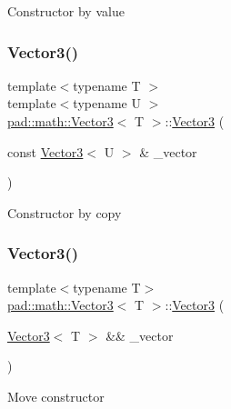 Constructor by value \mbox{\label{structpad_1_1math_1_1_vector3_a7f6a17638301c9ddaec4ea300a3c846a}} 
\subsubsection{\texorpdfstring{Vector3()}{Vector3()}\hspace{0.1cm}{\footnotesize\ttfamily [3/4]}}
{\footnotesize\ttfamily template$<$typename T $>$ \\
template$<$typename U $>$ \\
\mbox{\hyperlink{structpad_1_1math_1_1_vector3}{pad\+::math\+::\+Vector3}}$<$ T $>$\+::\mbox{\hyperlink{structpad_1_1math_1_1_vector3}{Vector3}} (\begin{DoxyParamCaption}\item[{const \mbox{\hyperlink{structpad_1_1math_1_1_vector3}{Vector3}}$<$ U $>$ \&}]{\+\_\+vector }\end{DoxyParamCaption})}

Constructor by copy \mbox{\label{structpad_1_1math_1_1_vector3_adf7a624bdd20e8d79c6fe663c36ce43b}} 
\subsubsection{\texorpdfstring{Vector3()}{Vector3()}\hspace{0.1cm}{\footnotesize\ttfamily [4/4]}}
{\footnotesize\ttfamily template$<$typename T$>$ \\
\mbox{\hyperlink{structpad_1_1math_1_1_vector3}{pad\+::math\+::\+Vector3}}$<$ T $>$\+::\mbox{\hyperlink{structpad_1_1math_1_1_vector3}{Vector3}} (\begin{DoxyParamCaption}\item[{\mbox{\hyperlink{structpad_1_1math_1_1_vector3}{Vector3}}$<$ T $>$ \&\&}]{\+\_\+vector }\end{DoxyParamCaption})\hspace{0.3cm}{\ttfamily [default]}}

Move constructor \mbox{\label{structpad_1_1math_1_1_vector3_a8a778f1112409992f9e95a10f9760cfd}} 
